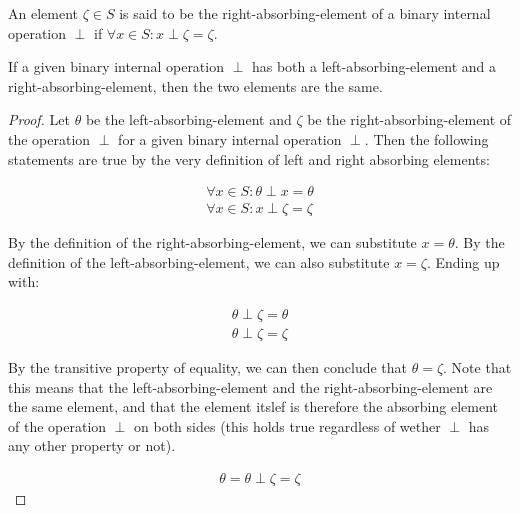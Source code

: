 \begin{definition}
    An element $\zeta \in S$ is said to be the right-absorbing-element of a binary internal operation $\perp$ if $\forall x \in S: x \perp \zeta = \zeta$.
\end{definition}

\begin{lemma}
    If a given binary internal operation $\perp$ has both a left-absorbing-element and a right-absorbing-element, then the two elements are the same.
\end{lemma}
\begin{proof}
    Let $\theta$ be the left-absorbing-element and $\zeta$ be the right-absorbing-element of the operation $\perp$ for a given binary 
    internal operation $\perp$. Then the following statements are true by the very definition of left and right absorbing elements:

    \begin{align*}
        \forall x \in S: \theta \perp x = \theta \\
        \forall x \in S: x \perp \zeta = \zeta
    \end{align*}

    By the definition of the right-absorbing-element, we can substitute $x = \theta$. By the definition of the
    left-absorbing-element, we can also substitute $x = \zeta$. Ending up with:

    \begin{align*}
        \theta \perp \zeta = \theta \\
        \theta \perp \zeta = \zeta
    \end{align*}

    By the transitive property of equality, we can then conclude that $\theta = \zeta$. Note that this means that 
    the left-absorbing-element and the right-absorbing-element are the same element, and that the element itslef is therefore 
    the absorbing element of the operation $\perp$ on both sides (this holds true regardless of wether $\perp$ has any other property or not).

    \begin{align*}
        \theta = \theta \perp \zeta = \zeta
    \end{align*}
\end{proof}

\newpage